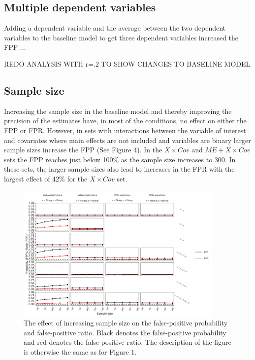 \subsection{Multiple dependent variables}
Adding a dependent variable and the average between the two dependent variables to the baseline model to get three dependent variables increased the FPP ...

REDO ANALYSIS WITH r=.2 TO SHOW CHANGES TO BASELINE MODEL

\subsection{Sample size}
Increasing the sample size in the baseline model and thereby improving the precision of the estimates have, in most of the conditions, no effect on either the FPP or FPR. However, in sets with interactions between the variable of interest and covariates where main effects are not included and variables are binary larger sample sizes increase the FPP (See Figure 4). In the $X \times Cov$ and $ME + X \times Cov$ sets the FPP reaches just below 100\% as the sample size increases to 300. In these sets, the larger sample sizes also lead to increases in the FPR with the largest effect of 42\% for the $X \times Cov$ set.  


\begin{figure}[hbt!]
\includegraphics[width=0.9\textwidth]{R/Analysis/Result/Figures/Figure1D.jpeg}
\centering
\caption{The effect of increasing sample size on the false-positive probability and false-positive ratio. Black denotes the false-positive probability and red denotes the false-positive ratio. The description of the figure is otherwise the same as for Figure 1.}
\label{fig:mainfigure}
\end{figure}

